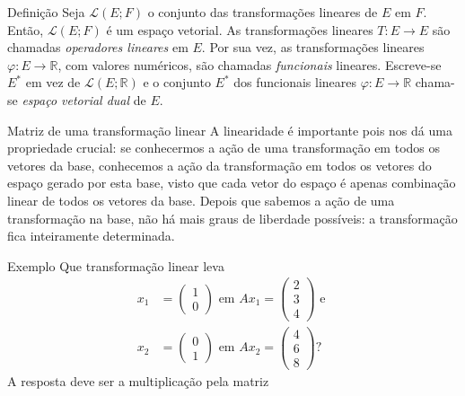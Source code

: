 \documentclass{beamer}
\begin{document}
\begin{darkframes}
\begin{frame}{}
  \begin{block}{Definição}
    Seja ${\mathcal{L}}(E;F)$ o conjunto das transformações lineares de $E$ em $F$. Então, ${\mathcal{L}}(E;F)$ é um espaço vetorial. As transformações lineares $T:E\rightarrow E$ são chamadas \emph{operadores lineares} em $E$. Por sua vez, as transformações lineares $\varphi:E\rightarrow {\mathbb{R}}$, com valores numéricos, são chamadas \emph{funcionais} lineares. Escreve-se $E^*$ em vez de ${\mathcal{L}}(E;{\mathbb{R}})$ e o conjunto $E^*$ dos funcionais lineares $\varphi:E\rightarrow {\mathbb{R}}$ chama-se \emph{espaço vetorial dual} de $E$.
  \end{block}
\end{frame}

\begin{frame}{Matriz de uma transformação linear}
  A linearidade é importante pois nos dá uma propriedade crucial: se conhecermos a ação de uma transformação em todos os vetores da base, conhecemos a ação da transformação em todos os vetores do espaço gerado por esta base, visto que cada vetor do espaço é apenas combinação linear de todos os vetores da base. Depois que sabemos a ação de uma transformação na base, não há mais graus de liberdade possíveis: a transformação fica inteiramente determinada.
\end{frame}

\begin{frame}{Exemplo}
  Que transformação linear leva 
  \begin{align*}
    x_1 &= 
    \begin{pmatrix}
       1\\
       0
    \end{pmatrix}
    \text{ em } Ax_1 =
    \begin{pmatrix}
       2\\
       3\\
       4
    \end{pmatrix}
    \text{ e }\\
    x_2 &=
    \begin{pmatrix}
       0\\
       1
    \end{pmatrix}
    \text{ em } Ax_2 =
    \begin{pmatrix}
       4\\
       6\\
       8
    \end{pmatrix}
    ?
  \end{align*}
  A resposta deve ser a multiplicação pela matriz
\end{frame}


\end{darkframes}
\end{document}
